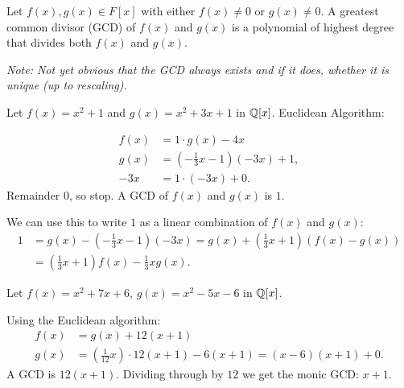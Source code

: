\documentclass[10pt, a4paper]{article}
\begin{document}
\begin{definition}
    Let $f(x), g(x) \in F[x]$ with either $f(x) \neq 0$ or $g(x) \neq 0$.
    A greatest common divisor 
    (GCD)
    of $f(x)$ and $g(x)$ is a polynomial of highest degree that divides both $f(x)$ and $g(x)$.
\end{definition}
\textit{Note:
Not yet obvious that the GCD always exists and if it does,
whether it is unique
(up to rescaling).}

\begin{example}
    Let $f(x) = x ^ 2 + 1$ and $g(x) = x ^ 2 + 3x + 1$ in $\mathbb{Q}[x]$.
    Euclidean Algorithm:
    
    \begin{solution}
        \begin{align*}
            f(x) &= 1 \cdot g(x) - 4x \\
            g(x) &= \left(-\frac{1}{3}x - 1\right)(-3x) + 1, \\
            -3x &= 1 \cdot (-3x) + 0.
        \end{align*}
        Remainder $0$,
        so stop.
        A GCD of $f(x)$ and $g(x)$ is $1$.

        We can use this to write $1$ as a linear combination of $f(x)$ and $g(x)$:
        \begin{align*}
            1 &= g(x) - \left(-\frac{1}{3}x - 1\right)(-3x) = g(x) + \left(\frac{1}{3}x + 1\right)(f(x) - g(x)) \\
            &= \left(\frac{1}{3}x + 1\right)f(x) - \frac{1}{3}xg(x).
        \end{align*}
    \end{solution}
\end{example}

\begin{example}
    Let $f(x) = x ^ 2 + 7x + 6$,
    $g(x) = x ^ 2 - 5x - 6$ in $\mathbb{Q}[x]$.

    \begin{solution}
        Using the Euclidean algorithm:
        \begin{align*}
            f(x) &= g(x) + 12(x + 1) \\
            g(x) &= \left(\frac{1}{12}x\right) \cdot 12(x + 1) - 6(x + 1) = (x - 6)(x + 1) + 0.
        \end{align*}
        A GCD is $12(x + 1)$.
        Dividing through by $12$ we get the monic GCD:
        $x + 1$.
    \end{solution}
\end{example}
\end{document}
